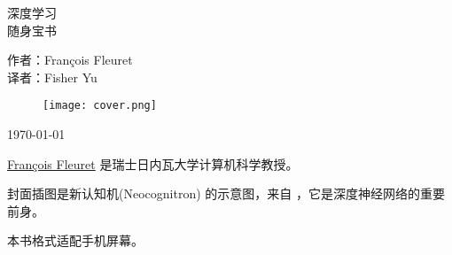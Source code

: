 \documentclass[oneside,11pt]{memoir}
\begin{document}
\thispagestyle{empty}

\begin{center}


{\huge 深度学习\\[0.75ex] 随身宝书}

\vspace*{4ex}

作者：François Fleuret \\
译者：Fisher Yu


\begin{figure}[!htbp]
\centering
\texttt{[image: cover.png]}
\end{figure}


\footnotesize \dotdate\today

\end{center}

\newpage



\href{https://fleuret.org/francois/}{François Fleuret} 是瑞士日内瓦大学计算机科学教授。

封面插图是新认知机(Neocognitron) 的示意图，来自 \cite{Fukushima1980}，它是深度神经网络的重要前身。

本书格式适配手机屏幕。


\vspace*{-3ex}

\newpage


{
\everymath{\color{black}}
\tableofcontents %
}

\clearpage

\listoffigures*
{}
\end{document}
